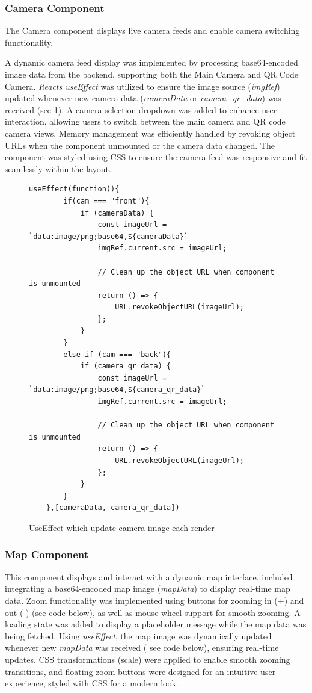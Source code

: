 \documentclass[a4paper,12pt]{extreport}
\begin{document}
\subsubsection{Camera Component}

The Camera component displays live camera feeds and enable camera
switching functionality.

A dynamic camera feed display was implemented by processing
base64-encoded image data from the backend, supporting both the Main
Camera and QR Code Camera. \emph{React\textquotesingle s useEffect} was
utilized to ensure the image source (\emph{imgRef}) updated whenever new
camera data (\emph{cameraData} or \emph{camera\_qr\_data}) was received
(see \cref{judFig12}). A camera selection dropdown was added to enhance user
interaction, allowing users to switch between the main camera and QR
code camera views. Memory management was efficiently handled by revoking
object URLs when the component unmounted or the camera data changed. The
component was styled using CSS to ensure the camera feed was responsive
and fit seamlessly within the layout.

\begin{figure}
  \begin{verbatim}
useEffect(function(){
        if(cam === "front"){
            if (cameraData) {
                const imageUrl = `data:image/png;base64,${cameraData}`
                imgRef.current.src = imageUrl;

                // Clean up the object URL when component is unmounted
                return () => {
                    URL.revokeObjectURL(imageUrl);
                };
            }
        }
        else if (cam === "back"){
            if (camera_qr_data) {
                const imageUrl = `data:image/png;base64,${camera_qr_data}`
                imgRef.current.src = imageUrl;

                // Clean up the object URL when component is unmounted
                return () => {
                    URL.revokeObjectURL(imageUrl);
                };
            }
        }
    },[cameraData, camera_qr_data])
  \end{verbatim}
\caption{UseEffect which update camera image each render}
\label{judFig12}
\end{figure}
\newpage
\subsubsection{Map Component}

This component displays and interact with a dynamic map interface.
included integrating a base64-encoded map image (\emph{mapData}) to
display real-time map data. Zoom functionality was implemented using
buttons for zooming in (+) and out (-) (see code below), as well as mouse
wheel support for smooth zooming. A loading state was added to display a
placeholder message while the map data was being fetched. Using
\emph{useEffect}, the map image was dynamically updated whenever new
\emph{mapData} was received ( see code below), ensuring real-time
updates. CSS transformations (scale) were applied to enable smooth
zooming transitions, and floating zoom buttons were designed for an
intuitive user experience, styled with CSS for a modern look.
\end{document}
